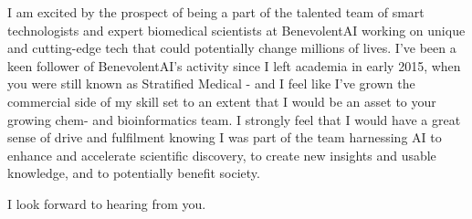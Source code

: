 \documentclass[11pt,a4paper,sans]{moderncv}        %
\begin{document}
I am excited by the prospect of being a part of the talented team of smart technologists and expert biomedical scientists at BenevolentAI
working on unique and cutting-edge tech that could potentially change millions of lives.
%
I've been a keen follower of BenevolentAI's activity since I left academia in early 2015, when you were still known as Stratified Medical - and I feel 
like I've grown the commercial side of my skill set to an extent that I would be an asset to your growing chem- and bioinformatics team.
%
I strongly feel that I would have a great sense of drive and fulfilment knowing I was 
part of the team
harnessing AI 
to enhance and accelerate scientific discovery, 
to create new insights and usable knowledge, 
and to potentially benefit society.
					
I look forward to hearing from you. 

~\\
~\\

\makeletterclosing

%

%
\renewcommand{\refname}{Links}

\end{document}
